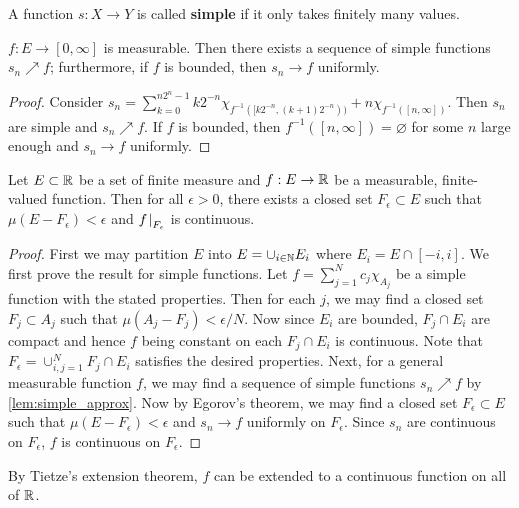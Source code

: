 \begin{definition}
    A function $s:X\to Y$ is called \textbf{simple} if it only takes 
    finitely many values.
\end{definition}

\begin{lemma}\label{lem:simple_approx}
    $f:E\to[0,\infty]$ is measurable. Then there exists a sequence 
    of simple functions $s_n\nearrow f$; furthermore, if $f$ is bounded, 
    then $s_n\to f$ uniformly.
\end{lemma}
\begin{proof}
    Consider $s_n = \sum_{k=0}^{n2^n-1} k2^{-n}\chi_{f^{-1}([k2^{-n},(k+1)2^{-n}))} 
    + n\chi_{f^{-1}([n,\infty])}$. Then $s_n$ are simple and $s_n\nearrow f$. 
    If $f$ is bounded, then $f^{-1}([n,\infty])=\varnothing$ for some $n$ 
    large enough and $s_n\to f$ uniformly.
\end{proof}

\begin{theorem}[Lusin]
    Let $E\subset\mathbb{R}$ be a set of finite measure and $f:E\to\mathbb{R}$ be a measurable, 
    finite-valued function. Then for all $\epsilon>0$, there exists a 
    closed set $F_\epsilon\subset E$ such that $\mu(E-F_\epsilon)<\epsilon$ 
    and $f\left.\hspace{-0.2em}\right|_{F_\epsilon}$ is continuous.
\end{theorem}
\begin{proof}
    First we may partition $E$ into $E = \cup_{i\in\mathbb{N}} E_i$ where $E_i = E\cap[-i,i]$. 
    We first prove the result for simple functions. Let $f = \sum_{j=1}^{N}c_j\chi_{A_j}$ 
    be a simple function with the stated properties. Then for each $j$, 
    we may find a closed set $F_j\subset A_j$ such that $\mu(A_j-F_j)<\epsilon/N$. 
    Now since $E_i$ are bounded, $F_j\cap E_i$ are compact and hence 
    $f$ being constant on each $F_j\cap E_i$ is continuous. Note that 
    $F_\epsilon = \cup_{i,j=1}^{N} F_j\cap E_i$ satisfies the desired 
    properties. Next, for a general measurable function $f$, we may find 
    a sequence of simple functions $s_n\nearrow f$ by \cref{lem:simple_approx}. 
    Now by Egorov's theorem, we may find a closed set $F_\epsilon\subset E$ such 
    that $\mu(E-F_\epsilon)<\epsilon$ and $s_n\to f$ uniformly on $F_\epsilon$. 
    Since $s_n$ are continuous on $F_\epsilon$, $f$ is continuous on $F_\epsilon$.
\end{proof}
\begin{remark}
    By Tietze's extension theorem, $f$ can be extended to a continuous 
    function on all of $\mathbb{R}$.
\end{remark}

